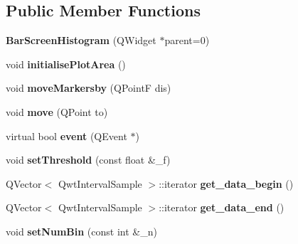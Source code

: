 \subsection*{Public Member Functions}
\begin{DoxyCompactItemize}
\item 
\mbox{\label{classBarScreenHistogram_aa3cc6d1640882d3d16207abdf1d920d5}} 
{\bfseries Bar\+Screen\+Histogram} (Q\+Widget $\ast$parent=0)
\item 
\mbox{\label{classBarScreenHistogram_a7bbde2d9c8da75756d9caf5c3dd40ca0}} 
void {\bfseries initialise\+Plot\+Area} ()
\item 
\mbox{\label{classBarScreenHistogram_a0be353de9471e4b7b77626e37d273841}} 
void {\bfseries move\+Markersby} (Q\+PointF dis)
\item 
\mbox{\label{classBarScreenHistogram_afdce5fc9b8f8fbcc5c12dd3344dad78d}} 
void {\bfseries move} (Q\+Point to)
\item 
\mbox{\label{classBarScreenHistogram_ac0df6530441f3cc48bc1609baf59cb6f}} 
virtual bool {\bfseries event} (Q\+Event $\ast$)
\item 
\mbox{\label{classBarScreenHistogram_a325533d70611598df0ab5c079b1b59fd}} 
void {\bfseries set\+Threshold} (const float \&\+\_\+f)
\item 
\mbox{\label{classBarScreen_a1950f3ff2fcb6f9c815480d79c41bcdd}} 
Q\+Vector$<$ Qwt\+Interval\+Sample $>$\+::iterator {\bfseries get\+\_\+data\+\_\+begin} ()
\item 
\mbox{\label{classBarScreen_a8b4c985476a91cfbaba65f9efb2fb98d}} 
Q\+Vector$<$ Qwt\+Interval\+Sample $>$\+::iterator {\bfseries get\+\_\+data\+\_\+end} ()
\item 
\mbox{\label{classBarScreen_aa39400dbc0e698031f526a5696c5f05e}} 
void {\bfseries set\+Num\+Bin} (const int \&\+\_\+n)
\item 
\mbox{\label{classBarScreen_a31a0a0513a3506fd31b4921d9ef9de5f}} 

\end{DoxyCompactItemize}
